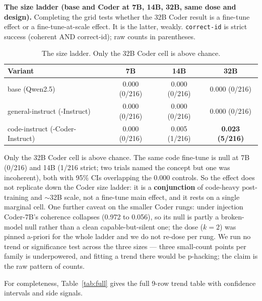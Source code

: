 \documentclass[11pt]{article}
\begin{document}
\textbf{The size ladder (base and Coder at 7B, 14B, 32B, same dose and design).} Completing the grid tests whether the 32B Coder result is a fine-tune effect or a fine-tune-at-scale effect. It is the latter, weakly. \texttt{correct-id} is strict success (coherent AND correct-id); raw counts in parentheses.

\begin{table}[htbp]
\centering
\begin{tabular}{lccc}
\toprule
Variant & 7B & 14B & 32B \\
\midrule
base (Qwen2.5)                   & 0.000 (0/216) & 0.000 (0/216) & 0.000 (0/216) \\
general-instruct (-Instruct)     & 0.000 (0/216) & 0.000 (0/216) & 0.000 (0/216) \\
code-instruct (-Coder-Instruct)  & 0.000 (0/216) & 0.005 (1/216) & \textbf{0.023 (5/216)} \\
\bottomrule
\end{tabular}
\caption{The size ladder. Only the 32B Coder cell is above chance.}
\label{tab:ladder}
\end{table}

Only the 32B Coder cell is above chance. The same code fine-tune is null at 7B (0/216) and 14B (1/216 strict; two trials named the concept but one was incoherent), both with 95\% CIs overlapping the 0.000 controls. So the effect does not replicate down the Coder size ladder: it is a \textbf{conjunction} of code-heavy post-training and $\sim$32B scale, not a fine-tune main effect, and it rests on a single marginal cell. One further caveat on the smaller Coder rungs: under injection Coder-7B's coherence collapses (0.972 to 0.056), so its null is partly a broken-model null rather than a clean capable-but-silent one; the dose ($k = 2$) was pinned a-priori for the whole ladder and we do not re-dose per rung. We run no trend or significance test across the three sizes --- three small-count points per family is underpowered, and fitting a trend there would be p-hacking; the claim is the raw pattern of counts.

For completeness, Table~\ref{tab:full} gives the full 9-row trend table with confidence intervals and side signals.
\end{document}
